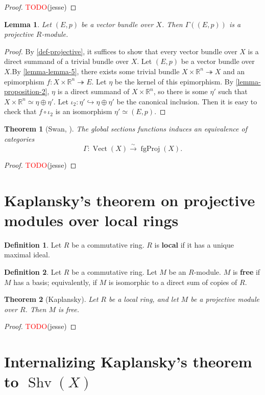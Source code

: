 \documentclass[11pt]{article}
\newcommand{\R}{\mathbb{R}}
\newcommand{\remph}[1]{\textcolor{red}{#1}}
\newcommand{\TODO}{\remph{TODO}}
\newcommand{\Vect}{\operatorname{Vect}}
\newcommand{\fgProj}{\operatorname{fgProj}}
\newcommand{\Shv}{\operatorname{Shv}}
\theoremstyle{plain}
\newtheorem{lemma}{Lemma}[section]
\newtheorem{theorem}{Theorem}[section]
\theoremstyle{definition}
\newtheorem{definition}{Definition}[section]
\begin{document}
\begin{proof}
  \TODO(jesse)
\end{proof}

\begin{lemma}
  \label{lemma-global-sections-projective}
  Let \((E,p)\) be a vector bundle over \(X\). Then \(\Gamma((E,p))\) is a projective \(R\)-module.
\end{lemma}

\begin{proof}
  By \ref{def-projective}, it suffices to show that every vector bundle over \(X\) is a direct summand of a trivial bundle over \(X\). Let \((E,p)\) be a vector bundle over \(X\).By \ref{lemma-lemma-5}, there exists some trivial bundle \(X \times \R^n \twoheadrightarrow X\) and an epimorphism \(f : X \times \R^n \twoheadrightarrow E\). Let \(\eta\) be the kernel of this epimorphism. By \ref{lemma-proposition-2}, \(\eta\) is a direct summand of \(X \times \R^n\), so there is some \(\eta'\) such that \(X \times \R^n \simeq \eta \oplus \eta'\). Let \(\iota_2 : \eta' \hookrightarrow \eta \oplus \eta'\) be the canonical inclusion. Then it is easy to check that \(f \circ \iota_2\) is an isomorphism \(\eta' \simeq (E,p)\).
\end{proof}

\begin{theorem}[Swan, \cite{swan1962vector}]
  The global sections functions induces an equivalence of categories
  \[\Gamma : \Vect(X) \overset{\sim}{\longrightarrow} \fgProj(X).\]
\end{theorem}

\begin{proof}
  \TODO(jesse)
\end{proof}

\section{Kaplansky's theorem on projective modules over local rings}

\begin{definition}\label{def-local-ring}
  Let \(R\) be a commutative ring. \(R\) is \textbf{local} if it has a unique maximal ideal.
\end{definition}

\begin{definition}\label{def-free-module}
  Let \(R\) be a commutative ring. Let \(M\) be an \(R\)-module. \(M\) is \textbf{free} if \(M\) has a basis; equivalently, if \(M\) is isomorphic to a direct sum of copies of \(R\).
\end{definition}

\begin{theorem}[Kaplansky]\label{thm-kaplansky}
  Let \(R\) be a local ring, and let \(M\) be a projective module over \(R\). Then \(M\) is free.
\end{theorem}

\begin{proof}
  \TODO(jesse)
\end{proof}

\section{Internalizing Kaplansky's theorem to \(\Shv(X)\)}


\end{document}
